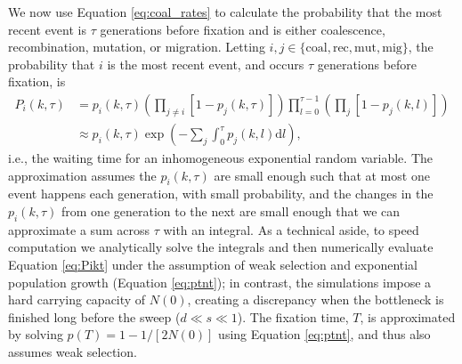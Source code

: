 \documentclass[]{article}
\begin{document}
We now use Equation \ref{eq:coal_rates} to calculate the probability that the most recent event is $\tau$ generations before fixation and is either coalescence, recombination, mutation, or migration. 
Letting $i,j\in\{\mathrm{coal, rec, mut, mig}\}$, the probability that $i$ is the most recent event, and occurs $\tau$ generations before fixation, is \citep[c.f., equation 6 in][]{pennings2006soft}
\begin{equation}\label{eq:Pikt}
\begin{aligned}
P_{i}(k,\tau) &= p_{i}(k,\tau) \left( \prod_{j\neq i} [1 - p_{j}(k,\tau)] \right) \prod_{l=0}^{\tau-1} \left( \prod_{j} [1 - p_{j}(k,l)] \right)\\
&\approx p_{i}(k,\tau) \exp \left( -\sum_{j} \int_{0}^{\tau} p_{j}(k,l) \mathrm{d}l \right),
\end{aligned}
\end{equation}
i.e., the waiting time for an inhomogeneous exponential random variable.
The approximation assumes the $p_i(k,\tau)$ are small enough such that at most one event happens each generation, with small probability, and the changes in the $p_i(k,\tau)$ from one generation to the next are small enough that we can approximate a sum across $\tau$ with an integral.
As a technical aside, to speed computation we analytically solve the integrals and then numerically evaluate Equation \ref{eq:Pikt} under the assumption of weak selection and exponential population growth (Equation \ref{eq:ptnt}); in contrast, the simulations impose a hard carrying capacity of $N(0)$, creating a discrepancy when the bottleneck is finished long before the sweep ($d\ll s \ll1$).
The fixation time, $T$, is approximated by solving $p(T) = 1-1/[2N(0)]$ using Equation \ref{eq:ptnt}, and thus also assumes weak selection.
\end{document}
